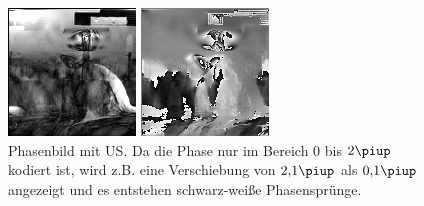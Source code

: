 \documentclass[
    11pt,
    ngerman
]{scrbook}
\begin{document}
\begin{figure}[htbp]
    \begin{minipage}[htbp]{.48\textwidth}
        \centering
        \includegraphics[width=.8\textwidth]{Abbildungen/2014-11-27_18_1_amp_kontrast.png}
        \caption{%
            Amplitudenbild mit US. Oben im Bild sind der Spiegel und Verwirbelungen im Wasser durch den Ultraschall zu sehen. Auf Höhe der Mitte sind Bildstörungen zu erkennen.
        }
        \label{fig:prob1_ampl_US}
    \end{minipage}
    \hfill
    \begin{minipage}[htbp]{.48\textwidth}
        \centering
        \includegraphics[width=.8\textwidth]{Abbildungen/2014-11-27_19_1_phase.png}
        \caption{%
            Phasenbild mit US. Da die Phase nur im Bereich 0 bis $2\piup$ kodiert ist, wird z.B. eine Verschiebung von $\num{2.1}\piup$ als $\num{.1}\piup$ angezeigt und es entstehen schwarz-weiße Phasensprünge.
        }
        \label{fig:prob1_phas_US}
    \end{minipage}
\end{figure}
\end{document}
